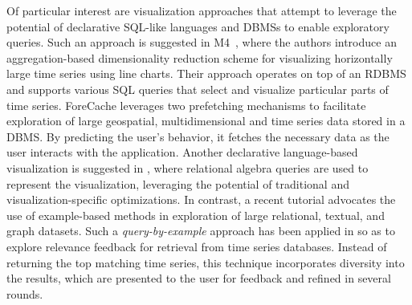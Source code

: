 Of particular interest are visualization approaches that attempt to leverage the potential of declarative SQL-like languages and DBMSs to enable exploratory queries. Such an approach is suggested in M4~\cite{jugel2014m4}, where the authors introduce an aggregation-based dimensionality reduction scheme for visualizing horizontally large time series using line charts. Their approach operates on top of an RDBMS and supports various SQL queries that select and visualize particular parts of time series. ForeCache \cite{battle2016sigmod} leverages two prefetching mechanisms to facilitate exploration of large geospatial, multidimensional and time series data stored in a DBMS. By predicting the user's behavior, it fetches the necessary data as the user interacts with the application. Another declarative language-based visualization is suggested in \cite{wu2014vldb}, where relational algebra queries are used to represent the visualization, leveraging the potential of traditional and visualization-specific optimizations. In contrast, a recent tutorial \cite{mottin2017vldb} advocates the use of example-based methods in exploration of large relational, textual, and graph datasets. Such a {\em query-by-example} approach has been applied in \cite{eravci2013vldb} so as to explore relevance feedback for retrieval from time series databases. Instead of returning the top matching time series, this technique incorporates diversity into the results, which are presented to the user for feedback and refined in several rounds.

